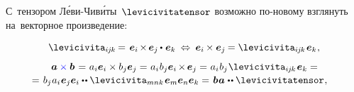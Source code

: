 \begin{otherlanguage}{russian}
С~тензором Л\'{е}ви\hbox{-\!}Чив\'{и}ты~$\levicivitatensor$ возможно по\hbox{-}новому взглянуть на~векторное произведение:

\nopagebreak\vspace{-0.3em}\begin{equation*}
\levicivita_{i\hspace{-0.1ex}j\hspace{-0.1ex}k} \hspace{-0.15ex} = \hspace{.15ex}
\hspace{.1ex} \bm{e}_i \hspace{-0.2ex} \times \hspace{-0.2ex} \bm{e}_j \hspace{-0.1ex} \dotp \hspace{.12ex} \bm{e}_k
\:\Leftrightarrow\:
\bm{e}_i \hspace{-0.1ex} \times \bm{e}_j \hspace{-0.12ex}
= \levicivita_{i\hspace{-0.1ex}j\hspace{-0.1ex}k} \hspace{.2ex} \bm{e}_k
\hspace{.1ex} ,
\end{equation*}\vspace{-1.6em}
\begin{multline}
\bm{a} \mathcolor{blue}{\times} \bm{b} \hspace{.2ex}
= \hspace{.1ex} a_i \bm{e}_i \times b_j \bm{e}_j
= \hspace{.1ex} a_i \hspace{.1ex} b_j \bm{e}_i \hspace{-0.2ex} \times \hspace{-0.2ex} \bm{e}_j
= \hspace{.1ex} a_i \hspace{.1ex} b_j \hspace{.1ex} \levicivita_{i\hspace{-0.1ex}j\hspace{-0.1ex}k} \hspace{.2ex} \bm{e}_k =
\\[-0.12em]
\shoveright{= \hspace{.2ex} b_j \hspace{.1ex} a_i \hspace{.1ex} \bm{e}_j \bm{e}_i \dotdotp \levicivita_{mnk} \hspace{.2ex} \bm{e}_m \bm{e}_n \bm{e}_k
= \hspace{.2ex} \bm{b} \hspace{.1ex} \bm{a} \hspace{.1ex} \dotdotp \levicivitatensor \hspace{.1ex} ,}

\end{multline}
\end{otherlanguage}
